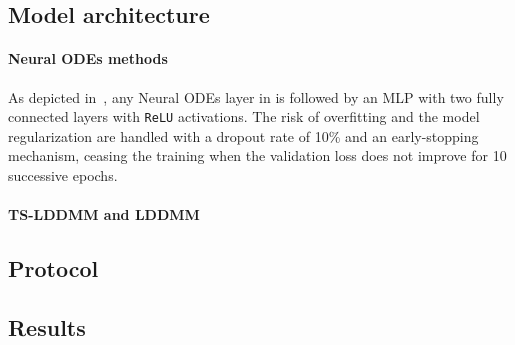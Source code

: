 \subsection{Model architecture}

\paragraph{Neural ODEs methods}
As depicted in~\cite{oh2024stable}, any Neural ODEs layer in  is followed by an MLP with two fully connected layers with \texttt{ReLU} activations. The risk of overfitting and the model regularization are handled with a dropout rate of 10\% and an early-stopping mechanism, ceasing the training when the validation loss does not improve for 10 successive epochs. 


\paragraph{TS-LDDMM and LDDMM}

\subsection{Protocol}


\subsection{Results}

